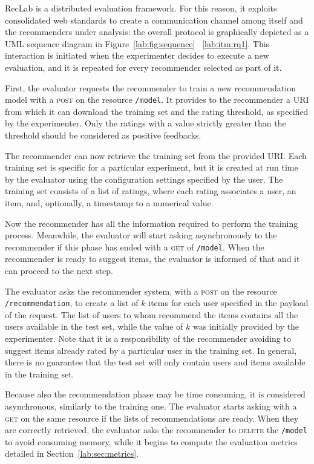 RecLab is a distributed evaluation framework. For this reason, it exploits consolidated web standards to create a communication channel among itself and the recommenders under analysis: the overall protocol is graphically depicted as a UML sequence diagram in Figure~\ref{lab:fig:sequence} ~\ref{lab:itm:rq1}. This interaction is initiated when the experimenter decides to execute a new evaluation, and it is repeated for every recommender selected as part of it.

First, the evaluator requests the recommender to train a new recommendation model with a \textsc{post} on the resource \texttt{/model}. It provides to the recommender a URI from which it can download the training set and the rating threshold, as specified by the experimenter. Only the ratings with a value strictly greater than the threshold should be considered as positive feedbacks.

The recommender can now retrieve the training set from the provided URI. Each training set is specific for a particular experiment, but it is created at run time by the evaluator using the configuration settings specified by the user. The training set consists of a list of ratings, where each rating associates a user, an item, and, optionally, a timestamp to a numerical value.

Now the recommender has all the information required to perform the training process. Meanwhile, the evaluator will start asking asynchronously to the recommender if this phase has ended with a \textsc{get} of \texttt{/model}. When the recommender is ready to suggest items, the evaluator is informed of that and it can proceed to the next step.

The evaluator asks the recommender system, with a \textsc{post} on the resource \texttt{/recommendation}, to create a list of $k$ items for each user specified in the payload of the request. The list of users to whom recommend the items contains all the users available in the test set, while the value of $k$ was initially provided by the experimenter. Note that it is a responsibility of the recommender avoiding to suggest items already rated by a particular user in the training set. In general, there is no guarantee that the test set will only contain users and items available in the training set.

Because also the recommendation phase may be time consuming, it is considered asynchronous, similarly to the training one. The evaluator starts asking with a \textsc{get} on the same resource if the lists of recommendations are ready. When they are correctly retrieved, the evaluator asks the recommender to \textsc{delete} the \texttt{/model} to avoid consuming memory, while it begins to compute the evaluation metrics detailed in Section~\ref{lab:sec:metrics}.


